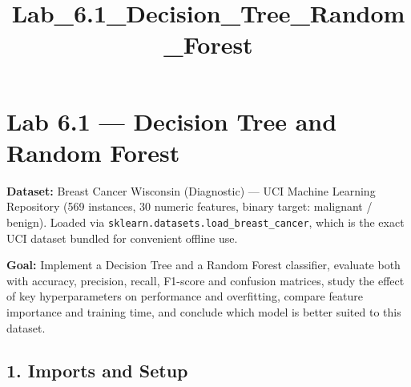 \documentclass[11pt]{article}
\title{Lab\_6.1\_Decision\_Tree\_Random\_Forest}
\begin{document}
    
    \maketitle
    
    

    
    \section{Lab 6.1 --- Decision Tree and Random
Forest}\label{lab-6.1-decision-tree-and-random-forest}

\textbf{Dataset:} Breast Cancer Wisconsin (Diagnostic) --- UCI Machine
Learning Repository (569 instances, 30 numeric features, binary target:
malignant / benign). Loaded via
\texttt{sklearn.datasets.load\_breast\_cancer}, which is the exact UCI
dataset bundled for convenient offline use.

\textbf{Goal:} Implement a Decision Tree and a Random Forest classifier,
evaluate both with accuracy, precision, recall, F1-score and confusion
matrices, study the effect of key hyperparameters on performance and
overfitting, compare feature importance and training time, and conclude
which model is better suited to this dataset.

    \subsection{1. Imports and Setup}\label{imports-and-setup}
\end{document}
